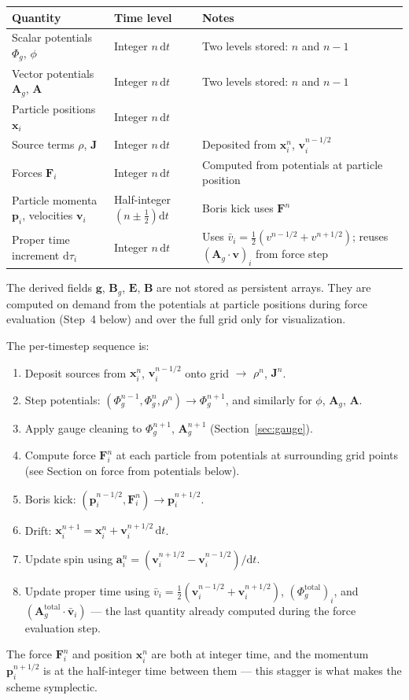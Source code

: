 \documentclass[11pt,a4paper]{article}
\newcommand{\vv}[1]{\mathbf{#1}}
\newcommand{\Phig}{\Phi_g}
\newcommand{\Ag}{\vv{A}_g}
\newcommand{\dd}{\mathrm{d}}
\begin{document}
\begin{center}
\begin{tabular}{@{}L{6cm}L{3cm}L{4cm}@{}}
\toprule
\textbf{Quantity} & \textbf{Time level} & \textbf{Notes} \\
\midrule
Scalar potentials $\Phig$, $\phi$ & Integer $n\,\dd t$ & Two levels stored: $n$ and $n-1$ \\
Vector potentials $\Ag$, $\vv{A}$ & Integer $n\,\dd t$ & Two levels stored: $n$ and $n-1$ \\
Particle positions $\vv{x}_i$ & Integer $n\,\dd t$ & \\
Source terms $\rho$, $\vv{J}$ & Integer $n\,\dd t$ & Deposited from $\vv{x}_i^n$, $\vv{v}_i^{n-1/2}$ \\
Forces $\vv{F}_i$ & Integer $n\,\dd t$ & Computed from potentials at particle position \\
Particle momenta $\vv{p}_i$, velocities $\vv{v}_i$ & Half-integer $(n\pm\tfrac{1}{2})\dd t$ & Boris kick uses $\vv{F}^n$ \\
Proper time increment $\dd\tau_i$ & Integer $n\,\dd t$ & Uses $\bar{v}_i = \tfrac{1}{2}(v^{n-1/2}+v^{n+1/2})$; reuses $(\Ag\cdot\vv{v})_i$ from force step \\
\bottomrule
\end{tabular}
\end{center}

The derived fields $\vv{g}$, $\vv{B}_g$, $\vv{E}$, $\vv{B}$ are not stored as persistent arrays.  They are computed on demand from the potentials at particle positions during force evaluation (Step~4 below) and over the full grid only for visualization.

The per-timestep sequence is:
\begin{enumerate}
  \item Deposit sources from $\vv{x}_i^n$, $\vv{v}_i^{n-1/2}$ onto grid $\to$ $\rho^n$, $\vv{J}^n$.
  \item Step potentials: $(\Phig^{n-1}, \Phig^n, \rho^n) \to \Phig^{n+1}$, and similarly for $\phi$, $\Ag$, $\vv{A}$.
  \item Apply gauge cleaning to $\Phig^{n+1}$, $\Ag^{n+1}$ (Section~\ref{sec:gauge}).
  \item Compute force $\vv{F}_i^n$ at each particle from potentials at surrounding grid points (see Section on force from potentials below).
  \item Boris kick: $(\vv{p}_i^{n-1/2}, \vv{F}_i^n) \to \vv{p}_i^{n+1/2}$.
  \item Drift: $\vv{x}_i^{n+1} = \vv{x}_i^n + \vv{v}_i^{n+1/2}\,\dd t$.
  \item Update spin using $\vv{a}_i^n = (\vv{v}_i^{n+1/2} - \vv{v}_i^{n-1/2})/\dd t$.
  \item Update proper time using $\bar{v}_i = \tfrac{1}{2}(\vv{v}_i^{n-1/2} + \vv{v}_i^{n+1/2})$, $(\Phig^{\mathrm{total}})_i$, and $(\Ag^{\mathrm{total}}\cdot\bar{\vv{v}}_i)$ --- the last quantity already computed during the force evaluation step.
\end{enumerate}
The force $\vv{F}_i^n$ and position $\vv{x}_i^n$ are both at integer time, and the momentum $\vv{p}_i^{n+1/2}$ is at the half-integer time between them --- this stagger is what makes the scheme symplectic.
\end{document}
